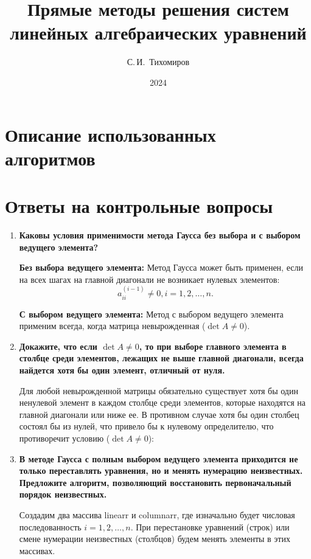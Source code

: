 \documentclass[12pt, a4paper]{article}
\title{Прямые методы решения систем
	линейных алгебраических уравнений}
\author{С.\,И.~Тихомиров}
\date{2024}
\begin{document}
	
	\maketitle
	
	\tableofcontents
	\section{Описание использованных алгоритмов}
	\section{Ответы на контрольные вопросы}
	
	\begin{enumerate}
	\item \textbf{Каковы условия применимости метода Гаусса без выбора
	и с выбором ведущего элемента?}
	
		\textbf{Без выбора ведущего элемента:} Метод Гаусса может быть применен, если на всех шагах на главной диагонали не возникает нулевых элементов: $$a^{(i-1)}_{ii}\ne 0, i = 1,2,\ldots,n.$$

		 \textbf {С выбором ведущего элемента:} Метод с выбором ведущего элемента  применим всегда, когда матрица невырожденная ($\det A \ne 0$).
		 
	\item \textbf{Докажите, что если $\det A \ne 0$, то при выборе главного
	элемента в столбце среди элементов, лежащих не выше главной диагонали, всегда найдется хотя бы один элемент, отличный от нуля.}
	
		 Для любой невырожденной матрицы обязательно существует хотя бы один ненулевой элемент в каждом столбце среди элементов, которые находятся на главной диагонали или ниже ее. В противном случае хотя бы один столбец состоял бы из нулей, что привело бы к нулевому определителю, что противоречит условию ($\det A \ne 0$):
	

	\item \textbf{В методе Гаусса с полным выбором ведущего элемента приходится не только переставлять уравнения, но и менять нумерацию неизвестных. Предложите алгоритм, позволяющий восстановить первоначальный порядок неизвестных.}
	
	Создадим два массива linearr и columnarr, где изначально будет числовая последованность $i=1,2,\ldots,n$. При перестановке уравнений (строк) или смене нумерации неизвестных (столбцов) будем менять элементы в этих массивах. 
	
	
	

\end{enumerate}
\end{document}
